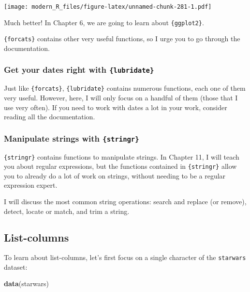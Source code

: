 \documentclass[]{gitbook}
\newenvironment{Shaded}{\begin{snugshade}}{\end{snugshade}}
\newcommand{\KeywordTok}[1]{\textcolor[rgb]{0.13,0.29,0.53}{\textbf{#1}}}
\newcommand{\NormalTok}[1]{#1}
\theoremstyle{definition}
\theoremstyle{definition}
\theoremstyle{definition}
\theoremstyle{remark}
\begin{document}
\texttt{[image: modern\_R\_files/figure-latex/unnamed-chunk-281-1.pdf]}

Much better! In Chapter 6, we are going to learn about
\texttt{\{ggplot2\}}.

\texttt{\{forcats\}} contains other very useful functions, so I urge you
to go through the documentation.

\hypertarget{get-your-dates-right-with-lubridate}{%
\subsubsection{\texorpdfstring{Get your dates right with
\texttt{\{lubridate\}}}{Get your dates right with \{lubridate\}}}\label{get-your-dates-right-with-lubridate}}

Just like \texttt{\{forcats\}}, \texttt{\{lubridate\}} contains numerous
functions, each one of them very useful. However, here, I will only
focus on a handful of them (those that I use very often). If you need to
work with dates a lot in your work, consider reading all the
documentation.

\hypertarget{manipulate-strings-with-stringr}{%
\subsubsection{\texorpdfstring{Manipulate strings with
\texttt{\{stringr\}}}{Manipulate strings with \{stringr\}}}\label{manipulate-strings-with-stringr}}

\texttt{\{stringr\}} contains functions to manipulate strings. In
Chapter 11, I will teach you about regular expressions, but the
functions contained in \texttt{\{stringr\}} allow you to already do a
lot of work on strings, without needing to be a regular expression
expert.

I will discuss the most common string operations: search and replace (or
remove), detect, locate or match, and trim a string.

\hypertarget{list-columns}{%
\subsection{List-columns}\label{list-columns}}

To learn about list-columns, let's first focus on a single character of
the \texttt{starwars} dataset:

\begin{Shaded}
\begin{Highlighting}[]
\KeywordTok{data}\NormalTok{(starwars)}
\end{Highlighting}
\end{Shaded}
\end{document}
